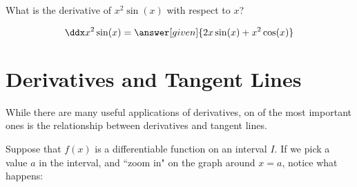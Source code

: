 \documentclass[nooutcomes]{ximera}
\begin{document}
 
\begin{question} 
  What is the derivative of $x^2 \sin(x) $ with respect to $x$?
  \begin{prompt} 
    \[
    \ddx x^2 \sin(x) = \answer[given]{2x \sin(x) +x^2 \cos(x)}
    \]
  \end{prompt}
\end{question}


\section{Derivatives and Tangent Lines}

While there are many useful applications of derivatives, on of the most important ones is the relationship between derivatives and tangent lines.

Suppose that $f(x)$ is a differentiable function on an interval $I$.  If we pick a value $a$ in the interval, and ``zoom in" on the graph around $x=a$, notice what happens:
\end{document}
